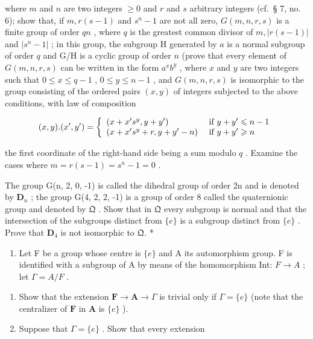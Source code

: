 where \(m\) and \(n\) are two integers \(\geqslant 0\) and \(r\) and \(s\) arbitrary integers (cf.~§ 7, no. 6); show that, if \(m, r(s - 1)\) and \(s^n - 1\) are not all zero, \(G(m, n, r, s)\) is a finite group of order \(qn\) , where \(q\) is the greatest common divisor of \(m, |r(s - 1)|\) and \(|s^n - 1|\) ; in this group, the subgroup H generated by \(a\) is a normal subgroup of order \(q\) and G/H is a cyclic group of order \(n\) (prove that every element of \(G(m, n, r, s)\) can be written in the form \(a^x b^y\) , where \(x\) and \(y\) are two integers such that \(0 \leqslant x \leqslant q - 1\) , \(0 \leqslant y \leqslant n - 1\) , and \(G(m, n, r, s)\) is isomorphic to the group consisting of the ordered pairs \((x, y)\) of integers subjected to the above conditions, with law of composition

\[
(x, y). (x ^ {\prime}, y ^ {\prime}) = \left\{ \begin{array}{l l} (x + x ^ {\prime} s ^ {y}, y + y ^ {\prime}) & \text { if } y + y ^ {\prime} \leqslant n - 1 \\ (x + x ^ {\prime} s ^ {y} + r, y + y ^ {\prime} - n) & \text { if } y + y ^ {\prime} \geqslant n \end{array} \right.
\]

the first coordinate of the right-hand side being a sum modulo \(q\) . Examine the cases where \(m = r(s - 1) = s^n - 1 = 0\) .

The group G(n, 2, 0, -1) is called the dihedral group of order 2n and is denoted by \(\mathbf{D}_{n}\) ; the group G(4, 2, 2, -1) is a group of order 8 called the quaternionic group and denoted by \(\mathfrak{Q}\) . Show that in \(\mathfrak{Q}\) every subgroup is normal and that the intersection of the subgroups distinct from \(\{e\}\) is a subgroup distinct from \(\{e\}\) . Prove that \(\mathbf{D}_{4}\) is not isomorphic to \(\mathfrak{Q}.\) *

\begin{enumerate}
\def\labelenumi{\arabic{enumi}.}
\setcounter{enumi}{4}
\tightlist
\item
  Let F be a group whose centre is \(\{e\}\) and A its automorphism group. F is identified with a subgroup of A by means of the homomorphism Int: \(F \rightarrow A\) ; let \(\Gamma = A/F\) .
\end{enumerate}

\begin{enumerate}
\def\labelenumi{(\alph{enumi})}
\item
  Show that the extension \(\mathbf{F} \to \mathbf{A} \to \Gamma\) is trivial only if \(\Gamma = \{e\}\) (note that the centralizer of \(\mathbf{F}\) in \(\mathbf{A}\) is \(\{e\}\) ).
\item
  Suppose that \(\Gamma = \{e\}\) . Show that every extension
\end{enumerate}

